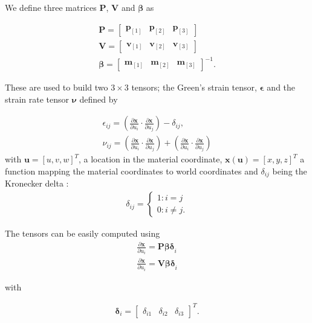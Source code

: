 \documentclass[tog]{acmsiggraph}
\begin{document}
We define three matrices $\mathbf{P}$, $\pmb{V}$ and $\pmb{\beta}$ as

\begin{gather}
\pmb{P} = [
\begin{matrix}
\pmb{p}_{[1]} & \pmb{p}_{[2]} & \pmb{p}_{[3]}
\end{matrix}]\\
\pmb{V} = [
\begin{matrix}
\pmb{v}_{[1]} & \pmb{v}_{[2]} & \pmb{v}_{[3]}
\end{matrix}]\\
\pmb{\beta} = [
\begin{matrix}
\pmb{m}_{[1]} & \pmb{m}_{[2]} & \pmb{m}_{[3]}
\end{matrix}]^{-1} .
\end{gather}

These are used to build two $3 \times 3$ tensors; the Green's strain tensor, $\pmb{\epsilon}$ and the strain rate tensor $\pmb{\nu}$ defined by 

\begin{gather}
\epsilon_{ij} = \left(\frac{\partial \pmb{x}}{\partial u_i} \cdot \frac{\partial \pmb{x}}{\partial u_j}\right) - \delta_{ij}, \\
\nu_{ij} = \left(\frac{\partial \pmb{x}}{\partial u_i} \cdot \frac{\partial \pmb{\dot{x}}}{\partial u_j}\right) +  \left(\frac{\partial \pmb{\dot{x}}}{\partial u_i} \cdot \frac{\partial \pmb{x}}{\partial u_j}\right)
\end{gather}
with $\pmb{u} = [u, v, w]^T$, a location in the material coordinate, $\pmb{x(u)} = [x,y,z]^T$ a function mapping the material coordinates to world coordinates and $\delta_{ij}$ being the Kronecker delta : 
\begin{gather}
\delta_{ij} = \begin{cases} 
1 : i = j\\
0 : i \neq j.
\end{cases}
\end{gather}

The tensors can be easily computed using 
\begin{gather}
\frac{\partial \pmb{x}}{\partial u_i} = \pmb{P \beta \delta}_i\\
\frac{\partial \pmb{\dot{x}}}{\partial u_i} = \pmb{V \beta \delta}_i
\end{gather}

with

\begin{gather}
\pmb{\delta}_i = [\begin{matrix}
\delta_{i1} & \delta_{i2} & \delta_{i3}
\end{matrix}]^T.
\end{gather}
\end{document}
